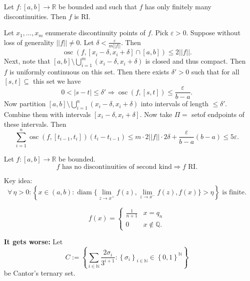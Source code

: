 \documentclass{notes}
\begin{document}
  \begin{lem}
    Let $f \colon [a, b] \to \mathbb R$ be bounded and such that $f$ has only finitely many discontinuities.
    Then $f$ is RI.
  \end{lem}
  
  \begin{prf}
    Let $x_1, \dots, x_m$ enumerate discontinuity points of $f$.
    Pick $\varepsilon > 0$.
    Suppose without loss of generality $||f|| \neq 0$.
    Let $\delta < \frac{\varepsilon}{m ||f||}$.
    Then 
    \[
      \operatorname{osc}(f, [x_i - \delta, x_i + \delta] \cap [a, b]) \leq 2 ||f||.
    \]
    Next, note that $[a, b] \setminus \bigcup_{i = 1}^m (x_i - \delta, x_i + \delta)$ is closed and thus compact.
    Then $f$ is uniformly continuous on this set.
    Then there exists $\delta' > 0$ such that for all $[s, t] \subseteq $ this set we have 
    \[
      0 < \left | s - t \right | \leq \delta' \Rightarrow \operatorname{osc}(f, [s, t]) \leq \frac{\varepsilon}{b - a}.
    \]
    Now partition $[a, b] \setminus \bigcup_{i = 1}^n (x_i - \delta, x_i + \delta)$ into intervals of length $\leq \delta'$.
    Combine them with intervals $[x_i - \delta, x_i + \delta]$.
    Now take $\Pi = $ setof endpoints of these intervals.
    Then 
    \[
      \sum_{i = 1}^n \operatorname{osc}(f, [t_{i - 1}, t_i]) (t_i - t_{i - 1}) \leq m \cdot 2 ||f|| \cdot 2 \delta + \frac{\varepsilon}{b - a} (b - a) \leq 5 \varepsilon.
    \]
  \end{prf}
  
  \begin{lem}
    Let $f \colon [a, b] \to \mathbb R$ be bounded.
    \[
      \text{$f$ has no discontinuities of second kind} \Rightarrow \text{$f$ RI}.
    \]
  \end{lem}
  
  \begin{prf}
    Key idea: 
    \[
      \forall \, \eta > 0: \left \{ x \in (a, b) : \operatorname{diam}\{ \lim_{z \to x^+} f(z), \lim_{z \to x^-} f(z), f(x) \} > \eta \right \} \text{ is finite}.
    \]
  \end{prf}
  
  \begin{eg}
    \[
      f(x) = \begin{cases}
        \frac{1}{n + 1} & x = q_n \\ 
        0 & x \not \in \mathbb Q.
      \end{cases}
    \]
  \end{eg}
  
  {\boldmath \bfseries It gets worse:} Let 
  \[ 
    C := \left \{ \sum_{i \in \mathbb N} \frac{2 \sigma_i}{3^{i + 1}} : \left \{ \sigma_i \right \}_{i \in \mathbb N} \in \left \{ 0, 1 \right \}^\mathbb N \right \}
  \]
  be Cantor's ternary set.
\end{document}
